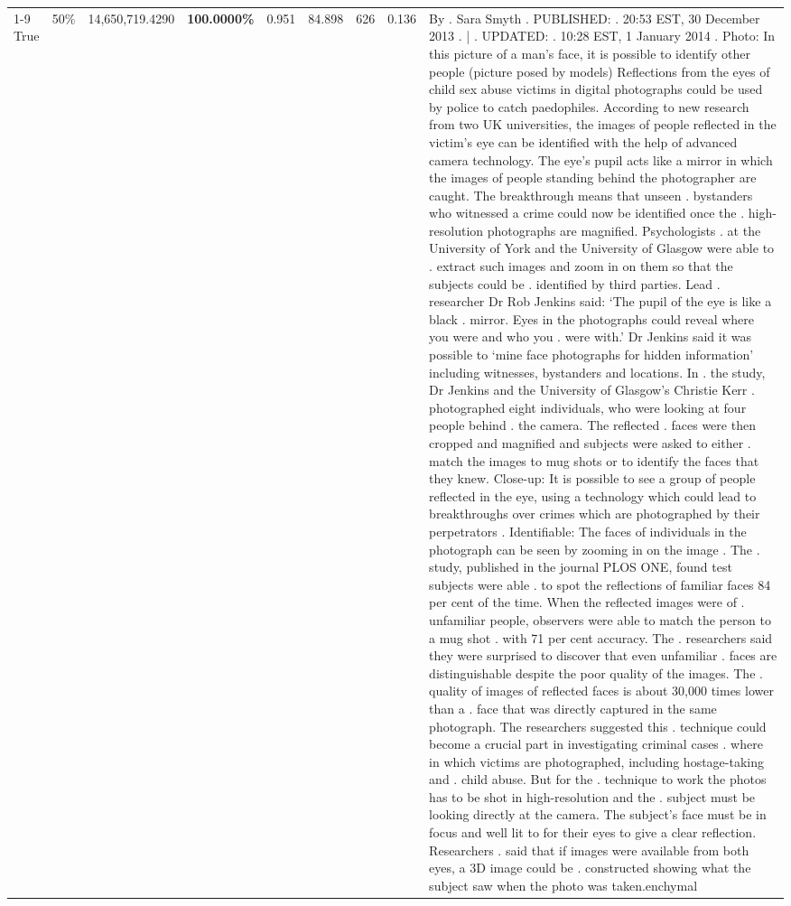 \begin{table}[H]
\begin{tabular}{lllrlllll}
\cline{1-9} \cline{2-9}
True & 50\% & 14,650,719.4290 & \bfseries \color{red} 100.0000\% & 0.951 & 84.898 & 626 & 0.136 & By . Sara Smyth . PUBLISHED: . 20:53 EST, 30 December 2013 . | . UPDATED: . 10:28 EST, 1 January 2014 . Photo: In this picture of a man's face, it is possible to identify other people (picture posed by models) Reflections from the eyes of child sex abuse victims in digital photographs could be used by police to catch paedophiles. According to new research from two UK universities, the images of people reflected in the victim's eye can be identified with the help of advanced camera technology. The eye's pupil acts like a mirror in which the images of people standing behind the photographer are caught. The breakthrough means that unseen . bystanders who witnessed a crime could now be identified once the . high-resolution photographs are magnified. Psychologists . at the University of York and the University of Glasgow were able to . extract such images and zoom in on them so that the subjects could be . identified by third parties. Lead . researcher Dr Rob Jenkins said: ‘The pupil of the eye is like a black . mirror. Eyes in the photographs could reveal where you were and who you . were with.' Dr Jenkins said it was possible to ‘mine face photographs for hidden information' including witnesses, bystanders and locations. In . the study, Dr Jenkins and the University of Glasgow's Christie Kerr . photographed eight individuals, who were looking at four people behind . the camera. The reflected . faces were then cropped and magnified and subjects were asked to either . match the images to mug shots or to identify the faces that they knew. Close-up: It is possible to see a group of people reflected in the eye, using a technology which could lead to breakthroughs over crimes which are photographed by their perpetrators . Identifiable: The faces of individuals in the photograph can be seen by zooming in on the image . The . study, published in the journal PLOS ONE, found test subjects were able . to spot the reflections of familiar faces 84 per cent of the time. When the reflected images were of . unfamiliar people, observers were able to match the person to a mug shot . with 71 per cent accuracy. The . researchers said they were surprised to discover that even unfamiliar . faces are distinguishable despite the poor quality of the images. The . quality of images of reflected faces is about 30,000 times lower than a . face that was directly captured in the same photograph. The researchers suggested this . technique could become a crucial part in investigating criminal cases . where in which victims are photographed, including hostage-taking and . child abuse. But for the . technique to work the photos has to be shot in high-resolution and the . subject must be looking directly at the camera. The subject's face must be in focus and well lit to for their eyes to give a clear reflection. Researchers . said that if images were available from both eyes, a 3D image could be . constructed showing what the subject saw when the photo was taken.enchymal \\

\end{tabular}
\end{table}
